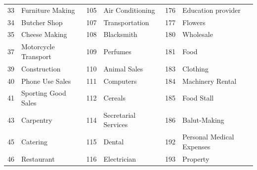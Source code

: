 \begin{longtable}[]{|r|l|r|l|r|l|}
	33                                & Furniture Making                   & 105                               & Air Conditioning                   & 176                               & Education
	provider                                                                                                                                                                                                                 \\
	34                                & Butcher Shop                       & 107                               & Transportation                     & 177                               & Flowers                            \\
	35                                & Cheese Making                      & 108                               & Blacksmith                         & 180                               & Wholesale                          \\
	37                                & Motorcycle Transport               & 109                               & Perfumes                           & 181                               & Food                               \\
	39                                & Construction                       & 110                               & Animal Sales                       & 183                               & Clothing                           \\
	40                                & Phone Use Sales                    & 111                               & Computers                          & 184                               & Machinery Rental                   \\
	41                                & Sporting Good Sales                & 112                               & Cereals                            & 185                               & Food Stall                         \\
	43                                & Carpentry                          & 114                               & Secretarial Services               & 186                               & Balut-Making                       \\
	45                                & Catering                           & 115                               & Dental                             & 192                               & Personal Medical Expenses          \\
	46                                & Restaurant                         & 116                               & Electrician                        & 193                               & Property                           \\

\end{longtable}

